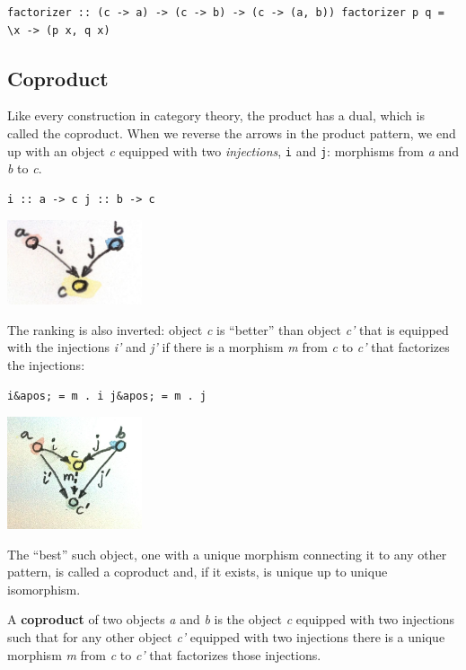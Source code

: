 \begin{verbatim}
factorizer :: (c -> a) -> (c -> b) -> (c -> (a, b)) factorizer p q = \x -> (p x, q x)
\end{verbatim}

\subsection{Coproduct}\label{coproduct}

Like every construction in category theory, the product has a dual,
which is called the coproduct. When we reverse the arrows in the product
pattern, we end up with an object \emph{c} equipped with two
\emph{injections}, \texttt{i} and \texttt{j}: morphisms from \emph{a}
and \emph{b} to \emph{c}.

\begin{verbatim}
i :: a -> c j :: b -> c
\end{verbatim}

\includegraphics[width=1.56250in]{images/coproductpattern.jpg}

The ranking is also inverted: object \emph{c} is ``better'' than object
\emph{c'} that is equipped with the injections \emph{i'} and \emph{j'}
if there is a morphism \emph{m} from \emph{c} to \emph{c'} that
factorizes the injections:

\begin{verbatim}
i&apos; = m . i j&apos; = m . j
\end{verbatim}

\includegraphics[width=1.56250in]{images/coproductranking.jpg}

The ``best'' such object, one with a unique morphism connecting it to
any other pattern, is called a coproduct and, if it exists, is unique up
to unique isomorphism.

A \textbf{coproduct} of two objects \emph{a} and \emph{b} is the object
\emph{c} equipped with two injections such that for any other object
\emph{c'} equipped with two injections there is a unique morphism
\emph{m} from \emph{c} to \emph{c'} that factorizes those injections.

